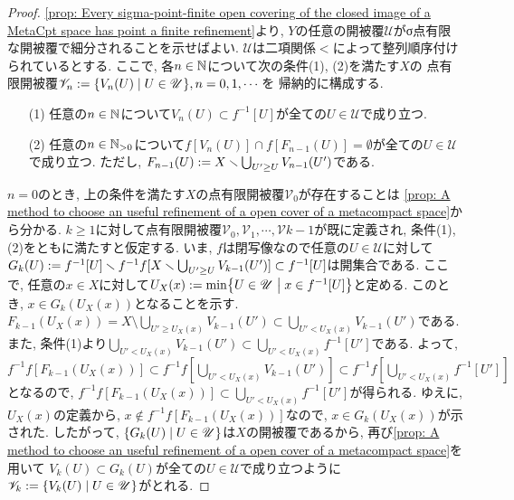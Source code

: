 \documentclass[uplatex, dvipdfmx, a4paper, 12pt, class=jsbook, crop=false]{standalone}
\begin{document}
\begin{proof}
	\cref{prop: Every sigma-point-finite open covering of the closed image of a MetaCpt space 
	has point a finite refinement}より,
	$ Y $の任意の開被覆$ \mathscr{U} $がσ点有限な開被覆で細分されることを示せばよい.
	$ \mathscr{U} $は二項関係$ < $によって整列順序付けられているとする.
	ここで, 各$ n \in \mathbb{N} $について次の条件(1), (2)を満たす$ X $の
	点有限開被覆$ \mathscr{V}_n \defeq \setcomp{V_n(U)}{U \in \mathscr{U}}, n=0, 1, \cdots $を
	帰納的に構成する.
	\begin{enumerate}
		\item[(1)] 任意の$ n \in \mathbb{N} $について$ V_n(U) \subset f^{-1}[U] $が全ての$ U \in \mathscr{U} $で成り立つ.
		\item[(2)] 任意の$ n \in \mathbb{N}_{>0} $について$ f[V_n(U)] \cap f[F_{n-1}(U)] = \emptyset $が全ての$ U \in \mathscr{U} $で成り立つ. 
		ただし, $ F_{n-1}(U) \mathrel{:=} X \smallsetminus \bigcup_{U' \geq U} V_{n-1}(U') $である. 
	\end{enumerate}
	$ n = 0 $のとき, 上の条件を満たす$ X $の点有限開被覆$ \mathscr{V}_0 $が存在することは
	\cref{prop: A method to choose an useful refinement of a open cover of a metacompact space}から分かる.
	$ k \geq 1 $に対して点有限開被覆$ \mathscr{V}_0, \mathscr{V}_1, \cdots, \mathscr{V}{k-1} $が既に定義され, 
	条件(1), (2)をともに満たすと仮定する.
	いま, $ f $は閉写像なので任意の$ U \in \mathscr{U} $に対して$ G_k(U) \mathrel{:=} f^{-1}[U] 
	\smallsetminus f^{-1}f[X \smallsetminus \bigcup_{U' \geq U} V_{k-1}(U')] \subset f^{-1}[U] $は開集合である.
	ここで, 任意の$ x \in X $に対して$ U_X(x) \defeq \min \setcomp{U \in \mathscr{U}}{x \in f^{-1}[U]} $と定める.
	このとき, $ x \in G_k(U_X(x)) $となることを示す.
	$ F_{k-1}(U_X(x)) = X \setminus \bigcup_{U' \geq U_X(x)} V_{k-1}(U') \subset \bigcup_{U' < U_X(x)} V_{k-1}(U') $である.
	また, 条件(1)より$ \bigcup_{U' < U_X(x)} V_{k-1}(U') \subset \bigcup_{U' < U_X(x)} f^{-1}[U'] $である.
	よって, $ f^{-1}f[F_{k-1}(U_X(x))] \subset f^{-1}f[\bigcup_{U' < U_X(x)} V_{k-1}(U')] 
	\subset f^{-1}f[\bigcup_{U' < U_X(x)} f^{-1}[U']] $となるので,
	$ f^{-1}f[F_{k-1}(U_X(x))] \subset \bigcup_{U' < U_X(x)} f^{-1}[U'] $が得られる.
	ゆえに, $ U_X(x) $の定義から, $ x \notin f^{-1}f[F_{k-1}(U_X(x))] $なので,
	$ x \in G_k(U_X(x)) $が示された. したがって, $ \setcomp{G_{k}(U)}{U \in \mathscr{U}} $は$ X $の開被覆であるから,
	再び\cref{prop: A method to choose an useful refinement of a open cover of a metacompact space}を用いて
	$ V_k(U) \subset G_k(U) $が全ての$ U \in \mathscr{U} $で成り立つように
	$ \mathscr{V}_k \defeq \setcomp{V_k(U)}{U \in \mathscr{U}} $がとれる.

\end{proof}
\end{document}
